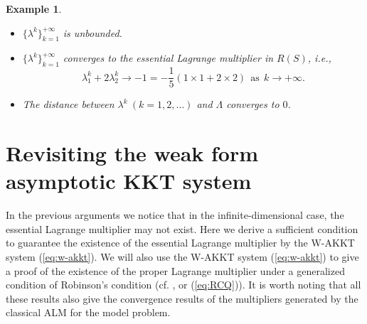 \documentclass[leqno]{amsart}
\newtheorem{Example}[Theorem]{Example}
\theoremstyle{definition}
\begin{document}
\begin{Example}
\begin{itemize}
\item $\{\lambda^k\}_{k=1}^{+\infty}$ is unbounded.
\par\vspace{4pt}

\item $\{\lambda^k\}_{k=1}^{+\infty}$ converges to the essential Lagrange multiplier in $R(S)$, i.e., 
$$\lambda^k_1 + 2\lambda^k_2 \rightarrow -1 = -\frac{1}{5}(1\times1 + 2\times2)\ \ \mbox{as}\ \ k\rightarrow + \infty.$$

\item The distance between $\lambda^k\ (k=1, 2, \dots)$ and $\Lambda$ converges to $0$.

\end{itemize}

\end{Example}

\section{Revisiting the weak form asymptotic KKT system}\label{sec:w-akkt}
\setcounter{equation}{0}
In the previous arguments we notice that in the infinite-dimensional case, the essential Lagrange multiplier may not exist. Here we derive a sufficient condition to guarantee the existence of the essential Lagrange multiplier by the W-AKKT system (\ref{eq:w-akkt}). We will also use the W-AKKT system (\ref{eq:w-akkt}) to give a proof of the existence of the proper Lagrange multiplier under a generalized condition of Robinson's condition  (cf. \cite[p. 5]{ito2008lagrange}, \cite{maurer1979first, robinson1976stability, zowe1979regularity} or (\ref{eq:RCQ})).  It is worth noting that all these results also give the convergence results of the multipliers generated by the classical ALM for the model problem. %
\end{document}
